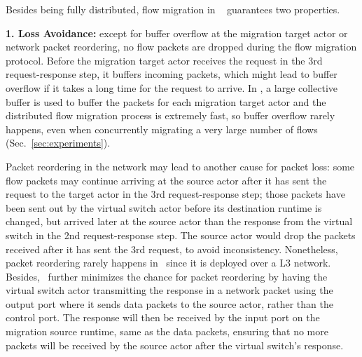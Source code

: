 
Besides being fully distributed, flow migration in \nfactor~ guarantees two properties. %

\textbf{1. Loss Avoidance:} except for buffer overflow at the migration target actor or network packet reordering, no flow packets are dropped during the flow migration protocol. Before the migration target actor receives the request in the 3rd request-response step, it buffers incoming packets, which might lead to buffer overflow if it takes a long time for the request to arrive. %
 In \nfactor, a large collective buffer is used to buffer the packets for each migration target actor and the distributed flow migration process is extremely fast, so buffer overflow rarely happens, even when concurrently migrating a very large number of flows (Sec.~\ref{sec:experiments}). 
 
 Packet reordering in the network may lead to another cause for packet loss: some flow packets may continue arriving at the source actor after it has sent the request to the target actor in the 3rd request-response step; those packets have been sent out by the virtual switch actor before its destination runtime is changed, but arrived later at the source actor than the response from the virtual switch in the 2nd request-response step. %
 The source actor would drop the packets received after it has sent the 3rd request, to avoid inconsistency. Nonetheless, packet reordering rarely happens in \nfactor~since it is deployed over a L3 network. Besides, \nfactor~further minimizes the chance for packet reordering by having the virtual switch actor transmitting the response in a network packet using the output port where it sends data packets to the source actor, rather than the control port. The response will then be received by the input port on the migration source runtime, same as the data packets, ensuring that no more packets will be received by the source actor after the virtual switch's response.

